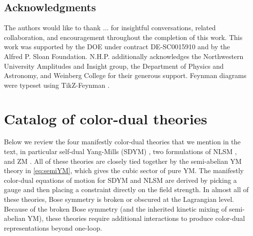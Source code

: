 \documentclass[11pt,letter]{article}
\begin{document}
\subsection*{Acknowledgments}
The authors would like to thank ... for insightful conversations,
related collaboration, and encouragement throughout the completion of
this work. This work was supported by the DOE under contract
DE-SC0015910 and by the Alfred P. Sloan
Foundation. N.H.P. additionally acknowledges the Northwestern
University Amplitudes and Insight group, the Department of Physics and
Astronomy, and Weinberg College for their generous support.  Feynman
diagrams were typeset using TikZ-Feynman \cite{Ellis:2016jkw}.

\appendix
\section{Catalog of color-dual theories}
\label{sec:CKLagrangians}

Below we review the four manifestly color-dual theories that we mention in
the text, in particular self-dual Yang-Mills (SDYM) \cite{Monteiro2011pc}, two formulations of NLSM \cite{Cheung:2016prv,Cheung:2020djz,Cheung:2021zvb}, and ZM \cite{Zakharov:1973pp, Cheung:2022mix}.  All
of these theories are closely tied together by the semi-abelian YM
theory in \cref{eq:semiYM}, which gives the cubic sector of pure YM.
The manifestly color-dual equations of motion for SDYM and NLSM are
derived by picking a gauge and then placing a constraint directly on the
field strength. In almost all of these
theories, Bose symmetry is broken or obscured at the Lagrangian level.
Because of the broken Bose symmetry (and the inherited kinetic mixing
of semi-abelian YM), these theories require additional interactions to produce color-dual representations beyond one-loop.
\end{document}
